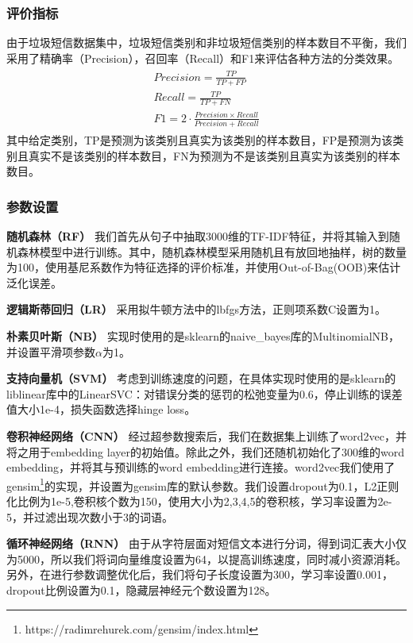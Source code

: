 \documentclass[a4paper]{article}
\begin{document}
\subsubsection{评价指标}
由于垃圾短信数据集中，垃圾短信类别和非垃圾短信类别的样本数目不平衡，我们采用了精确率（Precision），召回率（Recall）和F1来评估各种方法的分类效果。
\begin{align}
    \begin{split}
        Precision = \frac{TP}{TP + FP} \\
        Recall = \frac{TP}{TP + FN} \\
        F1 = 2\cdot\frac{Precision \times Recall}{Precision + Recall}
    \end{split}
\end{align}
其中给定类别，TP是预测为该类别且真实为该类别的样本数目，FP是预测为该类别且真实不是该类别的样本数目，FN为预测为不是该类别且真实为该类别的样本数目。

\subsubsection{参数设置}


\textbf{随机森林（RF）} 我们首先从句子中抽取3000维的TF-IDF特征，并将其输入到随机森林模型中进行训练。其中，随机森林模型采用随机且有放回地抽样，树的数量为100，使用基尼系数作为特征选择的评价标准，并使用Out-of-Bag(OOB)来估计泛化误差。

\textbf{逻辑斯蒂回归（LR）} 采用拟牛顿方法中的lbfgs方法，正则项系数C设置为1。

\textbf{朴素贝叶斯（NB）} 
实现时使用的是sklearn的naive\_bayes库的MultinomialNB，并设置平滑项参数$\alpha$为1。

\textbf{支持向量机（SVM）} 
考虑到训练速度的问题，在具体实现时使用的是sklearn的liblinear库中的LinearSVC：对错误分类的惩罚的松弛变量为0.6，停止训练的误差值大小1e-4，损失函数选择hinge loss。

\textbf{卷积神经网络（CNN）} 经过超参数搜索后，我们在数据集上训练了word2vec，并将之用于embedding layer的初始值。除此之外，我们还随机初始化了300维的word embedding，并将其与预训练的word embedding进行连接。word2vec我们使用了gensim\footnote{https://radimrehurek.com/gensim/index.html}的实现，并设置为gensim库的默认参数。我们设置dropout为0.1，L2正则化比例为1e-5,卷积核个数为150，使用大小为2,3,4,5的卷积核，学习率设置为2e-5，并过滤出现次数小于3的词语。



\textbf{循环神经网络（RNN）}
由于从字符层面对短信文本进行分词，得到词汇表大小仅为5000，所以我们将词向量维度设置为64，以提高训练速度，同时减小资源消耗。另外，在进行参数调整优化后，我们将句子长度设置为300，学习率设置0.001，dropout比例设置为0.1，隐藏层神经元个数设置为128。
\end{document}
